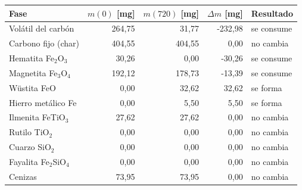 \begin{tabular}{lrrrl}
    \hline
    Fase & $m(0)$ [mg] & $m(720)$ [mg] & $\Delta m$ [mg] & Resultado \\
    \hline
    Volátil del carbón & 264,75 & 31,77 & -232,98 & se consume \\
    Carbono fijo (char) & 404,55 & 404,55 & 0,00 & no cambia \\
    Hematita Fe$_2$O$_3$ & 30,26 & 0,00 & -30,26 & se consume \\
    Magnetita Fe$_3$O$_4$ & 192,12 & 178,73 & -13,39 & se consume \\
    Wüstita FeO & 0,00 & 32,62 & 32,62 & se forma \\
    Hierro metálico Fe & 0,00 & 5,50 & 5,50 & se forma \\
    Ilmenita FeTiO$_3$ & 27,62 & 27,62 & 0,00 & no cambia \\
    Rutilo TiO$_2$ & 0,00 & 0,00 & 0,00 & no cambia \\
    Cuarzo SiO$_2$ & 0,00 & 0,00 & 0,00 & no cambia \\
    Fayalita Fe$_2$SiO$_4$ & 0,00 & 0,00 & 0,00 & no cambia \\
    Cenizas & 73,95 & 73,95 & 0,00 & no cambia \\
    \hline
\end{tabular}
